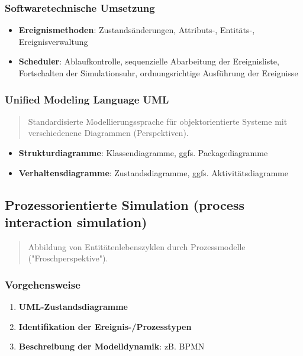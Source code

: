 \documentclass{article}
\begin{document}
\subsubsection{Softwaretechnische Umsetzung}
\begin{itemize}
  \item \textbf{Ereignismethoden}: Zustandsänderungen, Attributs-, Entitäts-, Ereignisverwaltung
  \item \textbf{Scheduler}: Ablaufkontrolle, sequenzielle Abarbeitung der Ereignisliste, Fortschalten der Simulationsuhr, ordnungsrichtige Ausführung der Ereignisse
\end{itemize}

\subsubsection{Unified Modeling Language UML}
\begin{quote}Standardisierte Modellierungssprache für objektorientierte Systeme mit verschiedenene Diagrammen (Perspektiven).\end{quote}

\begin{itemize}
  \item \textbf{Strukturdiagramme}: Klassendiagramme, ggfs. Packagediagramme
  \item \textbf{Verhaltensdiagramme}: Zustandsdiagramme, ggfs. Aktivitätsdiagramme
\end{itemize}

\subsection{Prozessorientierte Simulation (process interaction simulation)}
\begin{quote}Abbildung von Entitätenlebenszyklen durch Prozessmodelle ("Froschperspektive").\end{quote}

\subsubsection{Vorgehensweise}
\begin{enumerate}
  \item \textbf{UML-Zustandsdiagramme}
  \item \textbf{Identifikation der Ereignis-/Prozesstypen}
  \item \textbf{Beschreibung der Modelldynamik}: zB. BPMN
\end{enumerate}
\end{document}
